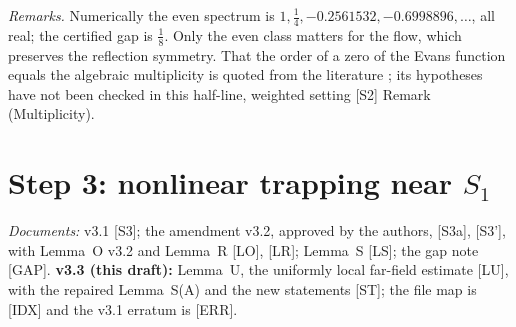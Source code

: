 \documentclass[11pt]{amsart}
\theoremstyle{definition}
\theoremstyle{remark}
\newcommand{\dref}[1]{[\textsf{#1}]}
\begin{document}
\emph{Remarks.} Numerically the even spectrum is $1,\frac14,-0.2561532,-0.6998896,\dots$, all real; the certified gap is $\frac18$. Only the even class matters for the flow, which preserves the reflection symmetry. That the order of a zero of the Evans function equals the algebraic multiplicity is quoted from the literature \cite{AlexanderGardnerJones1990,KapitulaPromislow2013,LatushkinSukhtayev2010}; its hypotheses have not been checked in this half-line, weighted setting \dref{S2} Remark (Multiplicity).

\section{Step 3: nonlinear trapping near \texorpdfstring{$S_1$}{S1}}\label{s:step3}
\emph{Documents:} v3.1 \dref{S3}; the amendment v3.2, approved by the authors, \dref{S3a}, \dref{S3'}, with Lemma~O v3.2 and Lemma~R \dref{LO}, \dref{LR}; Lemma~S \dref{LS}; the gap note \dref{GAP}. \textbf{v3.3 (this draft):} Lemma~U, the uniformly local far-field estimate \dref{LU}, with the repaired Lemma~S(A) and the new statements \dref{ST}; the file map is \dref{IDX} and the v3.1 erratum is \dref{ERR}.
\end{document}
